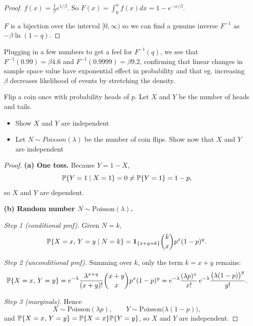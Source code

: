 \documentclass[10pt]{article}
\begin{document}
\begin{proof}
    $f(x) = \frac{1}{\beta}e^{1/\beta}$. So $F(x) = \int_{0}^{x} f(x) dx
    = 1 - e^{-x/\beta}$.

    $F$ is a bijection over the interval $[0, \infty)$ so we can find a genuine
    inverse $F^{-1}$ as $-\beta\ln(1-q)$.

\end{proof}

Plugging in a few numbers to get a feel for $F^{-1}(q)$, we see that
$F^{-1}(0.99) = \beta 4.6$ and $F^{-1}(0.9999) = \beta 9.2$, confirming
that linear changes in sample space value have exponential effect in
probability and that eg. increasing $\beta$ decreases likelihood of events by
stretching the density.


\setcounter{exercise}{10}
\begin{exercise}
    Flip a coin once with probability heads of $p$. Let $X$ and $Y$ be the
    number of heads and tails.
    \begin{itemize}
        \item{Show $X$ and $Y$ are independent}
        \item{Let $N \sim Poisson(\lambda)$ be the number of coin flips. Show
            now that $X$ and $Y$ are independent}
    \end{itemize}
\end{exercise}

\begin{proof}
\textbf{(a) One toss.}
Because \(Y = 1 - X\),
\[
\P\{Y=1\mid X=1\}=0 \neq \P\{Y=1\}=1-p,
\]
so \(X\) and \(Y\) are dependent.

\medskip
\textbf{(b) Random number \(N\sim\mathrm{Poisson}(\lambda)\).}

\emph{Step 1 (conditional pmf).}  Given \(N=k\),
\[
\P\{X=x,\,Y=y \mid N=k\}
   =\mathbf 1_{\{x+y=k\}}
     \binom{k}{x}p^{x}(1-p)^{y}.
\]

\emph{Step 2 (unconditional pmf).}  Summing over \(k\),
only the term \(k=x+y\) remains:
\[
\P\{X=x,\,Y=y\}
  =e^{-\lambda}\frac{\lambda^{x+y}}{(x+y)!}
    \binom{x+y}{x}p^{x}(1-p)^{y}
  =e^{-\lambda}\frac{(\lambda p)^{x}}{x!}\,
     e^{-\lambda}\frac{\bigl(\lambda(1-p)\bigr)^{y}}{y!}.
\]

\emph{Step 3 (marginals).}
Hence
\[
X\sim\mathrm{Poisson}(\lambda p),\qquad
Y\sim\mathrm{Poisson}\bigl(\lambda(1-p)\bigr),
\]
and
\(\P\{X=x,\,Y=y\}=\P\{X=x\}\P\{Y=y\}\), so \(X\) and \(Y\) are independent.
\end{proof}
\end{document}
